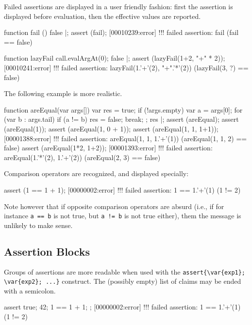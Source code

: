 Failed assertions are displayed in a user friendly fashion: first the
assertion is displayed before evaluation, then the effective values are
reported.

\begin{urbiscript}
function fail () { false }|;
assert (fail);
[00010239:error] !!! failed assertion: fail (fail == false)

function lazyFail { call.evalArgAt(0); false }|;
assert (lazyFail(1+2, "+" * 2));
[00010241:error] !!! failed assertion: lazyFail(1.'+'(2), "+".'*'(2)) (lazyFail(3, ?) == false)
\end{urbiscript}

The following example is more realistic.

\begin{urbiscript}
function areEqual(var args[])
{
  var res = true;
  if (!args.empty)
  {
    var a = args[0];
    for (var b : args.tail)
      if (a != b)
      {
        res = false;
        break;
      }
  };
  res
}|;
assert (areEqual);
assert (areEqual(1));
assert (areEqual(1, 0 + 1));
assert (areEqual(1, 1, 1+1));
[00001388:error] !!! failed assertion: areEqual(1, 1, 1.'+'(1)) (areEqual(1, 1, 2) == false)
assert (areEqual(1*2, 1+2));
[00001393:error] !!! failed assertion: areEqual(1.'*'(2), 1.'+'(2)) (areEqual(2, 3) == false)
\end{urbiscript}

Comparison operators are recognized, and displayed specially:
\begin{urbiscript}
assert (1 == 1 + 1);
[00000002:error] !!! failed assertion: 1 == 1.'+'(1) (1 != 2)
\end{urbiscript}

Note however that if opposite comparison operators are absurd (i.e., if for
instance \lstinline|a == b| is not true, but \lstinline|a != b| is not true
either), them the message is unlikely to make sense.

\subsection{Assertion Blocks}

Groups of assertions are more readable when used with the
\lstinline|assert{\var{exp1}; \var{exp2}; ...}| construct.  The (possibly
empty) list of claims may be ended with a semicolon.

\begin{urbiscript}
assert
{
  true;
  42;
  1 == 1 + 1;
};
[00000002:error] !!! failed assertion: 1 == 1.'+'(1) (1 != 2)
\end{urbiscript}

